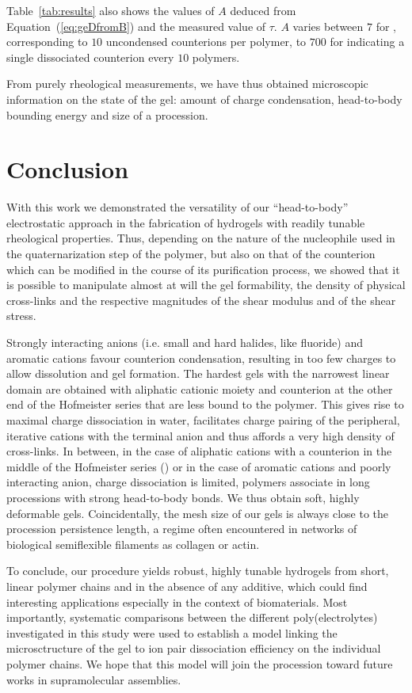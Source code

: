 \documentclass[journal=jacsat,manuscript=article]{achemso}
\begin{document}
Table~\ref{tab:results} also shows the values of $A$ deduced from Equation~(\ref{eq:geDfromB}) and the measured value of $\tau$. $A$ varies between $7$ for , corresponding to $10$ uncondensed counterions per polymer, to $700$ for  indicating a single dissociated counterion every $10$ polymers.

From purely rheological measurements, we have thus obtained microscopic information on the state of the gel: amount of charge condensation, head-to-body bounding energy and size of a procession.




\section{Conclusion}
With this work we demonstrated the versatility of our ``head-to-body'' electrostatic approach in the fabrication of hydrogels with readily tunable rheological properties. Thus, depending on the nature of the nucleophile used in the quaternarization step of the polymer, but also on that of the counterion which can be modified in the course of its purification process, we showed that it is possible to manipulate almost at will the gel formability, the density of physical cross-links and the respective magnitudes of the shear modulus and of the shear stress. 

Strongly interacting anions (i.e. small and hard halides, like fluoride) and aromatic cations favour counterion condensation, resulting in too few charges to allow dissolution and gel formation. The hardest gels with the narrowest linear domain are obtained with aliphatic cationic moiety and counterion at the other end of the Hofmeister series that are less bound to the polymer. This gives rise to maximal charge dissociation in water, facilitates charge pairing of the peripheral, iterative cations with the terminal anion and thus affords a very high density of cross-links. In between, in the case of aliphatic cations with a counterion in the middle of the Hofmeister series () or in the case of aromatic cations and poorly interacting anion, charge dissociation is limited, polymers associate in long processions with strong head-to-body bonds. We thus obtain soft, highly deformable gels. Coincidentally, the mesh size of our gels is always close to the procession persistence length, a regime often encountered in networks of biological semiflexible filaments as collagen or actin\cite{Meng2016}.

To conclude, our procedure yields robust, highly tunable hydrogels from short, linear polymer chains and in the absence of any additive, which could find interesting applications especially in the context of biomaterials. Most importantly, systematic comparisons between the different poly(electrolytes) investigated in this study were used to establish a model linking the microsctructure of the gel to ion pair dissociation efficiency on the individual polymer chains. We hope that this model will join the procession toward future works in supramolecular assemblies.
\end{document}
